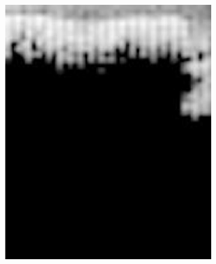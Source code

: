 \begin{figure}[h!]
\begin{subfigure}{0.45\textwidth}
		\includegraphics[width=\linewidth]{Images/DataMining/spectrogramYesSecond.jpg}
		\caption{}    %
		\label{subfig:SpectrogramYesSecond}
	\end{subfigure}
	
	\medskip 
	

\end{figure}
